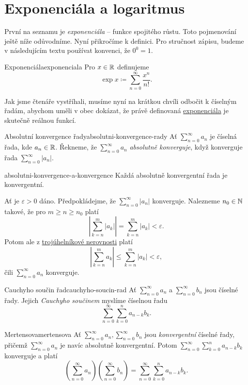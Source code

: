 \section{Exponenciála a logaritmus}
\label{sec:exponenciala-a-logaritmus}

První na seznamu je \emph{exponenciála} -- funkce spojitého růstu. Toto
pojmenování ještě níže odůvodníme. Nyní přikročíme k definici. Pro stručnost
zápisu, budeme v následujícím textu používat konvenci, že $0^{0} = 1$.

\begin{definition}{Exponenciála}{exponenciala}
 Pro $x \in \mathbb{R}$ definujeme
 \[
  \exp x \coloneqq \sum_{n=0}^{\infty} \frac{x^{n}}{n!}.
 \]
\end{definition}

Jak jsme čtenáře vystříhali, musíme nyní na krátkou chvíli odbočit k číselným
řadám, abychom uměli v obec dokázat, že právě definovaná
\hyperref[def:exponenciala]{exponenciála} je skutečně reálnou funkcí.

\begin{definition}{Absolutní konvergence řady}{absolutni-konvergence-rady}
 Ať $\sum_{n=0}^{\infty} a_n$ je číselná řada, kde $a_n \in \mathbb{R}$. Řekneme, že
 $\sum_{n=0}^{\infty} a_n$ \emph{absolutně konverguje}, když konverguje řada
 $\sum_{n=0}^{\infty} |a_n|$.
\end{definition}

\begin{lemma}{}{absolutni-konvergence-a-konvergence}
 Každá absolutně konvergentní řada je konvergentní.
\end{lemma}
\begin{lemproof}
 Ať je $\varepsilon>0$ dáno. Předpokládejme, že $\sum_{n=0}^{\infty} |a_n|$
 konverguje. Nalezneme $n_0 \in \mathbb{N}$ takové, že pro $m \geq n \geq n_0$ platí
 \[
  \left|\sum_{k=n}^m |a_k| \right| = \sum_{k=n}^m |a_k|<\varepsilon.
 \]
 Potom ale z \hyperref[lem:trojuhelnikova-nerovnost]{trojúhelníkové nerovnosti}
 platí
 \[
  \left| \sum_{k=n}^m a_k \right| \leq \sum_{k=n}^m |a_k|<\varepsilon,
 \]
 čili $\sum_{n=0}^{\infty} a_n$ konverguje.
\end{lemproof}

\begin{definition}{Cauchyho součin řad}{cauchyho-soucin-rad}
 Ať $\sum_{n=0}^{\infty} a_n$ a $\sum_{n=0}^{\infty} b_n$ jsou číselné řady.
 Jejich \emph{Cauchyho součinem} myslíme číselnou řadu
 \[
  \sum_{n=0}^{\infty} \sum_{k=0}^n a_{n-k}b_k.
 \]
\end{definition}
\begin{theorem}{Mertensova}{mertensova}
 Ať $\sum_{n=0}^{\infty} a_n, \sum_{n=0}^{\infty} b_n$ jsou \emph{konvergentní}
 číselné řady, přičemž $\sum_{n=0}^{\infty} a_n$ je navíc absolutně
 konvergentní. Potom $\sum_{n=0}^{\infty} \sum_{k=0}^n a_{n-k}b_k$ konverguje a
 platí
 \[
  \left( \sum_{n=0}^{\infty} a_n \right) \left( \sum_{n=0}^{\infty} b_n \right)
  = \sum_{n=0}^{\infty} \sum_{k=0}^n a_{n-k}b_k.
 \]
\end{theorem}


